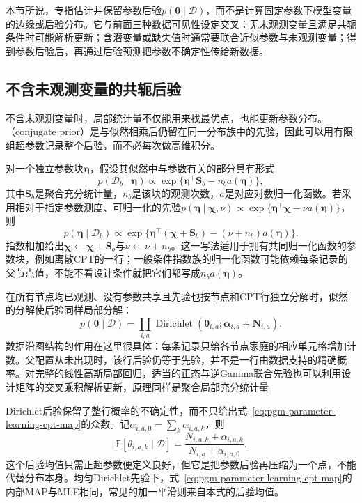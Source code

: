 本节所说，专指估计并保留参数后验$p(\bm{\theta}\mid\mathcal{D})$，而不是计算固定参数下模型变量的边缘或后验分布。它与前面三种数据可见性设定交叉：无未观测变量且满足共轭条件时可能解析更新；含潜变量或缺失值时通常要联合近似参数与未观测变量；得到参数后验后，再通过后验预测把参数不确定性传给新数据。

\subsection{不含未观测变量的共轭后验}
\label{sec:pgm-parameter-learning-conjugacy}

不含未观测变量时，局部统计量不仅能用来找最优点，也能更新参数分布。（conjugate prior）是与似然相乘后仍留在同一分布族中的先验，因此可以用有限组超参数记录整个后验，而不必每次做高维积分。

对一个独立参数块$\bm{\eta}$，假设其似然中与参数有关的部分具有形式
\[
  p(\mathcal{D}_b\mid\bm{\eta})
  \propto\exp\{\bm{\eta}^\top\bm{S}_b-n_ba(\bm{\eta})\},
\]
其中$\bm{S}_b$是聚合充分统计量，$n_b$是该块的观测次数，$a$是对应对数归一化函数。若采用相对于指定参数测度、可归一化的先验$p(\bm{\eta}\mid\bm{\chi},\nu)\propto\exp\{\bm{\eta}^\top\bm{\chi}-\nu a(\bm{\eta})\}$，则
\begin{equation}
  p(\bm{\eta}\mid\mathcal{D}_b)
  \propto
  \exp\{\bm{\eta}^\top(\bm{\chi}+\bm{S}_b)
                 -(\nu+n_b)a(\bm{\eta})\}.
  \label{eq:pgm-parameter-learning-conjugate-update}
\end{equation}
指数相加给出$\bm{\chi}\leftarrow\bm{\chi}+\bm{S}_b$与$\nu\leftarrow\nu+n_b$。这一写法适用于拥有共同归一化函数的参数块，例如离散CPT的一行；一般条件指数族的归一化函数可能依赖每条记录的父节点值，不能不看设计条件就把它们都写成$n_ba(\bm{\eta})$。

在所有节点均已观测、没有参数共享且先验也按节点和CPT行独立分解时，似然的分解使后验同样局部分解：
\begin{equation}
  p(\bm{\theta}\mid\mathcal{D})
   =\prod_{i,a}
     \operatorname{Dirichlet}
       (\bm{\theta}_{i,a};
        \bm{\alpha}_{i,a}+\bm{N}_{i,a}).
  \label{eq:pgm-parameter-learning-local-posterior}
\end{equation}
数据沿图结构的作用在这里很具体：每条记录只给各节点家庭的相应单元格增加计数。父配置从未出现时，该行后验仍等于先验，并不是一行由数据支持的精确概率。对完整的线性高斯局部回归，适当的正态与逆Gamma联合先验也可以利用设计矩阵的交叉乘积解析更新，原理同样是聚合局部充分统计量

Dirichlet后验保留了整行概率的不确定性，而不只给出式~\eqref{eq:pgm-parameter-learning-cpt-map}的众数。记$\alpha_{i,a,0}=\sum_k\alpha_{i,a,k}$，则
\begin{equation}
  \mathbb{E}[\theta_{i,a,k}\mid\mathcal{D}]
    =\frac{N_{i,a,k}+\alpha_{i,a,k}}
            {N_{i,a}+\alpha_{i,a,0}}.
  \label{eq:pgm-parameter-learning-dirichlet-estimates}
\end{equation}
这个后验均值只需正超参数便定义良好，但它是把参数后验再压缩为一个点，不能代替分布本身。均匀Dirichlet先验下，式~\eqref{eq:pgm-parameter-learning-cpt-map}的内部MAP与MLE相同，常见的加一平滑则来自本式的后验均值。


